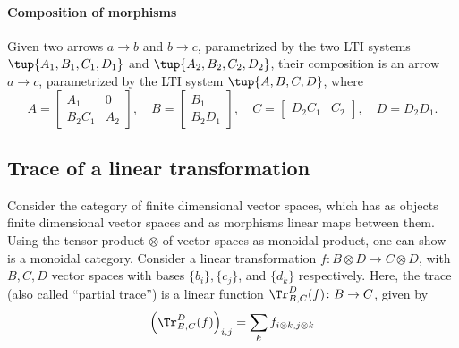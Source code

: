 \paragraph{Composition of morphisms}
Given two arrows $a\to b$ and $b\to c$, parametrized by the two LTI systems $\tup{A_1,B_1,C_1,D_1}$ and $\tup{A_2,B_2,C_2,D_2}$, their composition is an arrow $a\to c$, parametrized by the LTI system $\tup{A,B,C,D}$, where
\begin{equation}
  A=\begin{bmatrix}
      A_1&0\\
      B_2C_1&A_2
  \end{bmatrix},\quad
  B=\begin{bmatrix}
      B_1\\
      B_2D_1
  \end{bmatrix},\quad
  C=\begin{bmatrix}
      D_2C_1&C_2
  \end{bmatrix}, \quad
  D=D_2D_1.
\end{equation}

\subsection{Trace of a linear transformation}
\label{sub:trace-linear}
Consider the category \FinVect of finite dimensional vector spaces, which has as objects finite dimensional vector spaces and as morphisms linear maps between them. Using the tensor product $\otimes$ of vector spaces as monoidal product, one can show \FinVect is a monoidal category. Consider a linear transformation $f\colon B\otimes D\to C\otimes D$, with $B,C,D$ vector spaces with bases $\{b_i\},\{c_j\}$, and $\{d_k\}$ respectively. Here, the trace (also called ``partial trace'') is a linear function $\Tr_{B,C}
^D(f)\colon B\to C$, given by
\begin{equation}
  \left(\Tr_{B,C}
  ^D(f) \right)_{i,j}=\sum_{k}f_{i\otimes k,j\otimes k}
\end{equation}

